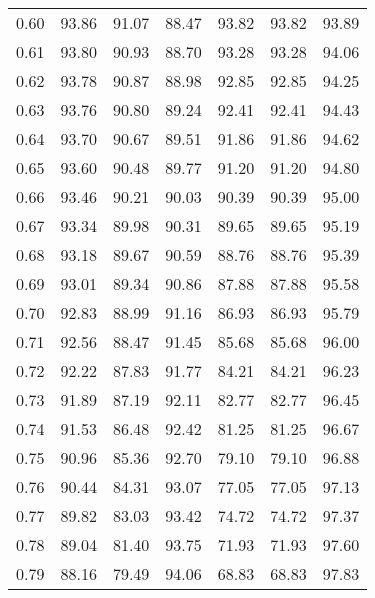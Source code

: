 \begin{tabular}{|c|c|c|c|c|c|c|}
      0.60 &     93.86 &     91.07 &      88.47 &   93.82 &      93.82 &         93.89 \\
      0.61 &     93.80 &     90.93 &      88.70 &   93.28 &      93.28 &         94.06 \\
      0.62 &     93.78 &     90.87 &      88.98 &   92.85 &      92.85 &         94.25 \\
      0.63 &     93.76 &     90.80 &      89.24 &   92.41 &      92.41 &         94.43 \\
      0.64 &     93.70 &     90.67 &      89.51 &   91.86 &      91.86 &         94.62 \\
      0.65 &     93.60 &     90.48 &      89.77 &   91.20 &      91.20 &         94.80 \\
      0.66 &     93.46 &     90.21 &      90.03 &   90.39 &      90.39 &         95.00 \\
      0.67 &     93.34 &     89.98 &      90.31 &   89.65 &      89.65 &         95.19 \\
      0.68 &     93.18 &     89.67 &      90.59 &   88.76 &      88.76 &         95.39 \\
      0.69 &     93.01 &     89.34 &      90.86 &   87.88 &      87.88 &         95.58 \\
      0.70 &     92.83 &     88.99 &      91.16 &   86.93 &      86.93 &         95.79 \\
      0.71 &     92.56 &     88.47 &      91.45 &   85.68 &      85.68 &         96.00 \\
      0.72 &     92.22 &     87.83 &      91.77 &   84.21 &      84.21 &         96.23 \\
      0.73 &     91.89 &     87.19 &      92.11 &   82.77 &      82.77 &         96.45 \\
      0.74 &     91.53 &     86.48 &      92.42 &   81.25 &      81.25 &         96.67 \\
      0.75 &     90.96 &     85.36 &      92.70 &   79.10 &      79.10 &         96.88 \\
      0.76 &     90.44 &     84.31 &      93.07 &   77.05 &      77.05 &         97.13 \\
      0.77 &     89.82 &     83.03 &      93.42 &   74.72 &      74.72 &         97.37 \\
      0.78 &     89.04 &     81.40 &      93.75 &   71.93 &      71.93 &         97.60 \\
      0.79 &     88.16 &     79.49 &      94.06 &   68.83 &      68.83 &         97.83 \\

\end{tabular}
